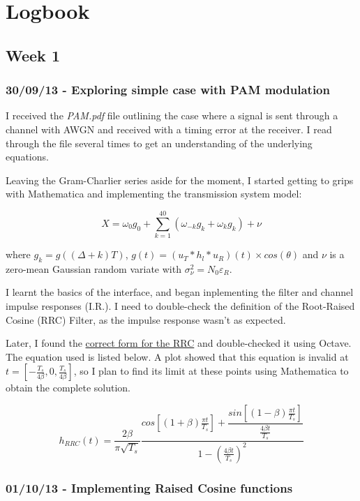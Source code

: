 \chapter{Logbook}

\section{Week 1}

\subsection{30/09/13 - Exploring simple case with PAM modulation}

I received the \emph{PAM.pdf} file outlining the case where a signal is
sent through a channel with AWGN and received with a timing error at the
receiver. I read through the file several times to get an understanding
of the underlying equations.

Leaving the Gram-Charlier series aside for the moment, I started getting
to grips with Mathematica and implementing the transmission system
model:

\[
X = \omega_0 g_0 + \sum_{k=1}^{40} ( \omega_{-k} g_{k} + \omega_k g_k ) + \nu
\]

where $g_k = g((\Delta + k)T)$,
$g(t) = (u_T \ast h_l \ast u_R)(t) \times cos(\theta)$ and $\nu$ is a
zero-mean Gaussian random variate with
$\sigma_{\nu}^2 = N_0 \varepsilon_R$.

I learnt the basics of the interface, and began inplementing the filter
and channel impulse responses (I.R.). I need to double-check the
definition of the Root-Raised Cosine (RRC) Filter, as the impulse
response wasn't as expected.

Later, I found the
\href{http://ntrs.nasa.gov/archive/nasa/casi.ntrs.nasa.gov/20120008631_2012008365.pdf}{correct
form for the RRC} and double-checked it using Octave. The equation used
is listed below. A plot showed that this equation is invalid at
$t = \left [ - \frac{T_s}{ 4 \beta } , 0 , \frac{T_s}{ 4 \beta } \right ]$,
so I plan to find its limit at these points using Mathematica to obtain
the complete solution.

\[
h_{RRC}(t) = \frac{2 \beta}{\pi \sqrt{T_s}} \frac{cos \left [ (1 + \beta) \frac{\pi t}{T_s} \right ] + \dfrac{sin \left [ (1 - \beta) \frac{\pi t}{T_s} \right ]}{\frac{4 \beta t}{T_s}}}{1 - \left ( \frac{4 \beta t}{T_s} \right )^2}
\]

\subsection{01/10/13 - Implementing Raised Cosine functions}


